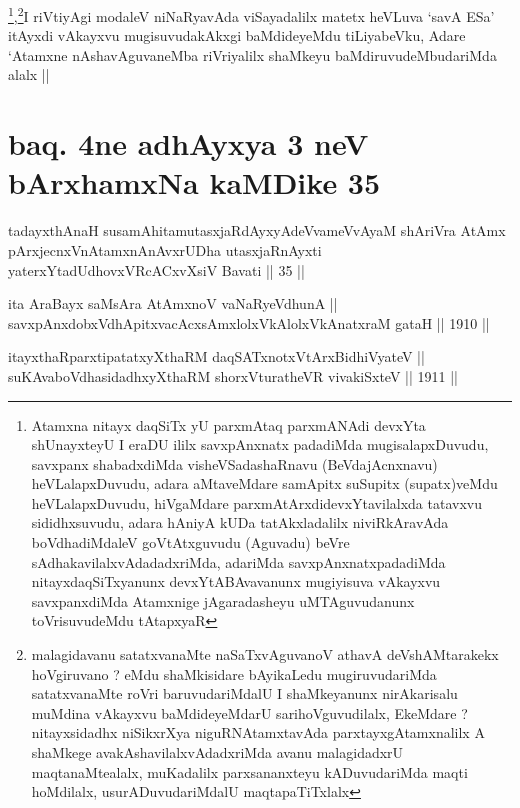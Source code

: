 \begin{artha}
\footnote[1]{Atamxna nitayx daqSiTx yU parxmAtaq parxmANAdi devxYta
  shUnayxteyU I eraDU ililx savxpAnxnatx padadiMda mugisalapxDuvudu,
  savxpanx shabadxdiMda visheVSadashaRnavu (BeVdajAcnxnavu)
  heVLalapxDuvudu, adara aMtaveMdare samApitx suSupitx (supatx)veMdu
  heVLalapxDuvudu, hiVgaMdare parxmAtArxdidevxYtavilalxda tatavxvu
  sididhxsuvudu, adara hAniyA kUDa tatAkxladalilx niviRkAravAda
  boVdhadiMdaleV goVtAtxguvudu (Aguvadu) beVre
  sAdhakavilalxvAdadadxriMda, adariMda savxpAnxnatxpadadiMda
  nitayxdaqSiTxyanunx devxYtABAvavanunx mugiyisuva vAkayxvu
  savxpanxdiMda Atamxnige jAgaradasheyu uMTAguvudanunx toVrisuvudeMdu
  tAtapxyaR},\footnote[2]{malagidavanu satatxvanaMte naSaTxvAguvanoV
  athavA deVshAMtarakekx hoVgiruvano ? eMdu shaMkisidare bAyikaLedu
  mugiruvudariMda satatxvanaMte roVri baruvudariMdalU I shaMkeyanunx
  nirAkarisalu muMdina vAkayxvu baMdideyeMdarU sarihoVguvudilalx,
  EkeMdare ?  nitayxsidadhx niSikxrXya niguRNAtamxtavAda
  parxtayxgAtamxnalilx A shaMkege avakAshavilalxvAdadxriMda avanu
  malagidadxrU maqtanaMtealalx, muKadalilx parxsananxteyu
  kADuvudariMda maqti hoMdilalx, usurADuvudariMdalU maqtapaTiTxlalx
}I riVtiyAgi modaleV niNaRyavAda
viSayadalilx matetx heVLuva `savA ESa' itAyxdi vAkayxvu
mugisuvudakAkxgi baMdideyeMdu tiLiyabeVku, Adare `Atamxne
nAshavAguvaneMba riVriyalilx shaMkeyu baMdiruvudeMbudariMda alalx ||
\end{artha}

\section*{baq. 4ne adhAyxya 3 neV bArxhamxNa kaMDike 35}

\begin{shl}
tadayxthAnaH susamAhitamutasxjaRdAyxyAdeVvameVvAyaM shAriVra AtAmx pArxjecnxVnAtamxnAnAvxrUDha utasxjaRnAyxti yaterxYtadUdhovxVRcACxvXsiV Bavati || 35 ||
\end{shl}


\begin{shl}
ita AraBayx saMsAra AtAmxnoV vaNaRyeV\s dhunA ||  \\
savxpAnxdobxVdhApitxvacAcxsAmxlolxVkAlolxVkAnatxraM gataH ||  1910 ||  
\end{shl}
				
\begin{shl}
itayxthaRparxtipatatxyXthaRM daqSATxnotxV\s tArxBidhiVyateV || \\
suKAvaboVdhasidadhxyXthaRM shorxVturatheVR vivakiSxteV ||  1911 ||  
\end{shl}

